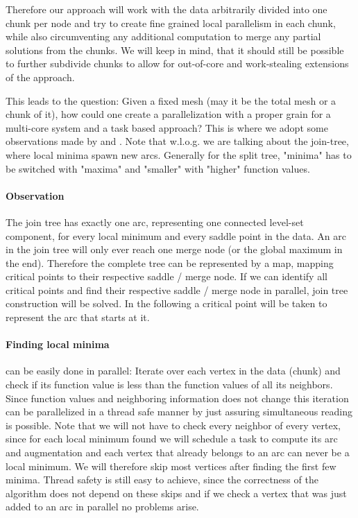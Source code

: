 \documentclass{scrartcl}
\begin{document}
Therefore our approach will work with the data arbitrarily divided into one chunk per node and try to create fine grained local parallelism in each chunk, while also circumventing any additional computation to merge any partial solutions from the chunks. We will keep in mind, that it should still be possible to further subdivide chunks to allow for out-of-core and work-stealing extensions of the approach. 

This leads to the question: Given a fixed mesh (may it be the total mesh or a chunk of it), how could one create a parallelization with a proper grain for a multi-core system and a task based approach? This is where we adopt some observations made by \cite{Carr} and \cite{adhoc}. Note that w.l.o.g. we are talking about the join-tree, where local minima spawn new arcs. Generally for the split tree, "minima" has to be switched with "maxima" and "smaller" with "higher" function values.

\paragraph{Observation}
The join tree has exactly one arc, representing one connected level-set component, for every local minimum and every saddle point in the data. An arc in the join tree will only ever reach one merge node (or the global maximum in the end). Therefore the complete tree can be represented by a map, mapping critical points to their respective saddle / merge node. If we can identify all critical points and find their respective saddle / merge node in parallel, join tree construction will be solved. In the following a critical point will be taken to represent the arc that starts at it.

\paragraph{Finding local minima} can be easily done in parallel: Iterate over each vertex in the data (chunk) and check if its function value is less than the function values of all its neighbors. Since function values and neighboring information does not change this iteration can be parallelized in a thread safe manner by just assuring simultaneous reading is possible. Note that we will not have to check every neighbor of every vertex, since for each local minimum found we will schedule a task to compute its arc and augmentation and each vertex that already belongs to an arc can never be a local minimum. We will therefore skip most vertices after finding the first few minima. Thread safety is still easy to achieve, since the correctness of the algorithm does not depend on these skips and if we check a vertex that was just added to an arc in parallel no problems arise.
\end{document}
